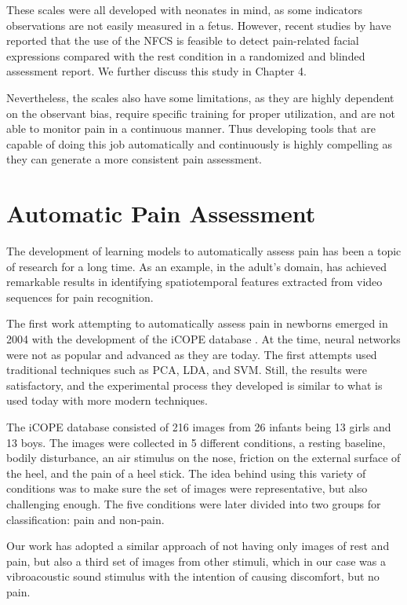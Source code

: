 These scales were all developed with neonates in mind, as some indicators observations are not easily measured in a fetus. However, recent studies by \citeauthor{bernardes2018feasibility} have reported that the use of the NFCS is feasible to detect pain-related facial expressions compared with the rest condition in a randomized and blinded assessment report. We further discuss this study in Chapter 4.

Nevertheless, the scales also have some limitations, as they are highly dependent on the observant bias, require specific training for proper utilization, and are not able to monitor pain in a continuous manner. Thus developing tools that are capable of doing this job automatically and continuously is highly compelling as they can generate a more consistent pain assessment.

\section{Automatic Pain Assessment}

The development of learning models to automatically assess pain has been a topic of research for a long time. As an example, in the adult's domain, \citep{MauricioCVC19} has achieved remarkable results in identifying spatiotemporal features extracted from video sequences for pain recognition.

The first work attempting to automatically assess pain in newborns emerged in 2004 with the development of the iCOPE database \citep{Brahnam2006}. At the time, neural networks were not as popular and advanced as they are today. The first attempts used traditional techniques such as PCA, LDA, and SVM. Still, the results were satisfactory, and the experimental process they developed is similar to what is used today with more modern techniques. 

The iCOPE database consisted of 216 images from 26 infants being 13 girls and 13 boys. The images were collected in 5 different conditions, a resting baseline, bodily disturbance, an air stimulus on the nose, friction on the external surface of the heel, and the pain of a heel stick. The idea behind using this variety of conditions was to make sure the set of images were representative, but also challenging enough. The five conditions were later divided into two groups for classification: pain and non-pain.

Our work has adopted a similar approach of not having only images of rest and pain, but also a third set of images from other stimuli, which in our case was a vibroacoustic sound stimulus with the intention of causing discomfort, but no pain. 

